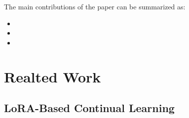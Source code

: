 \documentclass[letterpaper]{article} %
\begin{document}
The main contributions of the paper can be summarized as:
\begin{itemize}
    \item 
    \item 
    \item 
\end{itemize}





\section{Realted Work}

\subsection{LoRA-Based Continual Learning}
\end{document}
